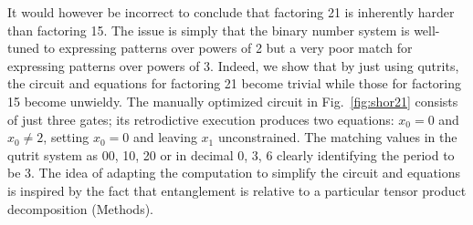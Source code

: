 \documentclass{article}
\begin{document}
\begin{refsection}
It would however be incorrect to conclude that factoring 21 is
inherently harder than factoring 15. The issue is simply that the
binary number system is well-tuned to expressing patterns over powers
of 2 but a very poor match for expressing patterns over powers of
3. Indeed, we show that by just using qutrits, the circuit and
equations for factoring 21 become trivial while those for factoring 15
become unwieldy. The manually optimized circuit in
Fig.~\ref{fig:shor21} consists of just three gates; its retrodictive
execution produces two equations: $x_0=0$ and $x_0 \neq 2$, setting
$x_0=0$ and leaving $x_1$ unconstrained. The matching values in the
qutrit system as 00, 10, 20 or in decimal 0, 3, 6 clearly identifying
the period to be 3. The idea of adapting the computation to simplify
the circuit and equations is inspired by the fact that entanglement is
relative to a particular tensor product decomposition (Methods).

\printbibliography[heading=subbibliography]
\end{refsection}


\newpage
\end{document}
